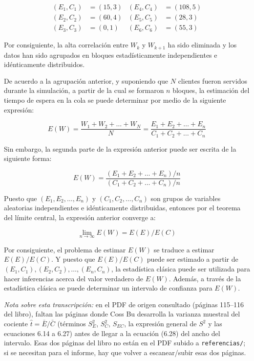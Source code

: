 \documentclass[11pt,letterpaper]{report}
\begin{document}
\begin{align*}
(E_1,C_1) &= (15,3) & (E_4,C_4) &= (108,5) \\
(E_2,C_2) &= (60,4) & (E_5,C_5) &= (28,3) \\
(E_3,C_3) &= (0,1) & (E_6,C_6) &= (55,3)
\end{align*}

Por consiguiente, la alta correlación entre $W_k$ y $W_{k+1}$ ha sido
eliminada y los datos han sido agrupados en bloques estadísticamente
independientes e idénticamente distribuidos.

De acuerdo a la agrupación anterior, y suponiendo que $N$ clientes
fueron servidos durante la simulación, a partir de la cual se formaron
$n$ bloques, la estimación del tiempo de espera en la cola se puede
determinar por medio de la siguiente expresión:

\begin{equation}
E(W) = \frac{W_1+W_2+\ldots+W_N}{N} = \frac{E_1+E_2+\ldots+E_n}{C_1+C_2+\ldots+C_n}
\end{equation}

Sin embargo, la segunda parte de la expresión anterior puede ser escrita
de la siguiente forma:

\begin{equation}
E(W) = \frac{(E_1+E_2+\ldots+E_n)/n}{(C_1+C_2+\ldots+C_n)/n}
\end{equation}

Puesto que $(E_1,E_2,\ldots,E_n)$ y $(C_1,C_2,\ldots,C_n)$ son grupos de
variables aleatorias independientes e idénticamente distribuidas,
entonces por el teorema del límite central, la expresión anterior
converge a:

\begin{equation}
\lim_{n \to \infty} E(W) = E(E)/E(C)
\end{equation}

Por consiguiente, el problema de estimar $E(W)$ se traduce a estimar
$E(E)/E(C)$. Y puesto que $E(E)/E(C)$ puede ser estimado a partir de
$(E_1,C_1), (E_2,C_2), \ldots, (E_n,C_n)$, la estadística clásica puede
ser utilizada para hacer inferencias acerca del valor verdadero de
$E(W)$. Además, a través de la estadística clásica se puede determinar
un intervalo de confianza para $E(W)$.

\bigskip
\noindent\emph{Nota sobre esta transcripción:} en el PDF de origen
consultado (páginas 115--116 del libro), faltan las páginas donde Coss
Bu desarrolla la varianza muestral del cociente $\hat{t}=\bar{E}/\bar{C}$
(términos $S_E^2$, $S_C^2$, $S_{EC}$, la expresión general de $S^2$ y
las ecuaciones 6.14 a 6.27) antes de llegar a la ecuación (6.28) del
ancho del intervalo. Esas dos páginas del libro no están en el PDF
subido a \texttt{referencias/}; si se necesitan para el informe, hay
que volver a escanear/subir esas dos páginas.
\end{document}
